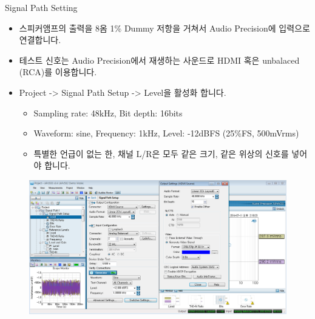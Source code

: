 \documentclass{beamer}
\begin{document}
\begin{frame}[t]{Signal Path Setting}
\begin{itemize}
\item 스피커앰프의 출력을 8옴 1\% Dummy 저항을 거쳐서 Audio Precision에 입력으로 연결합니다.
\item 테스트 신호는 Audio Precision에서 재생하는 사운드로 HDMI 혹은 unbalaced (RCA)를 이용합니다.
\item Project -> Signal Path Setup -> Level을 활성화 합니다.
	\begin{itemize}
	\item Sampling rate: 48kHz, Bit depth: 16bits
	\item Waveform: sine, Frequency: 1kHz, Level: -12dBFS (25\%FS, 500mVrms)
	\item 특별한 언급이 없는 한, 채널 L/R은 모두 같은 크기, 같은 위상의 신호를 넣어야 합니다.
	\end{itemize}
\end{itemize}

\begin{figure}[r]
	\includegraphics[height=0.4\textwidth]{figure/apsetting/signalPath.png}
\end{figure}
\end{frame}
\end{document}
